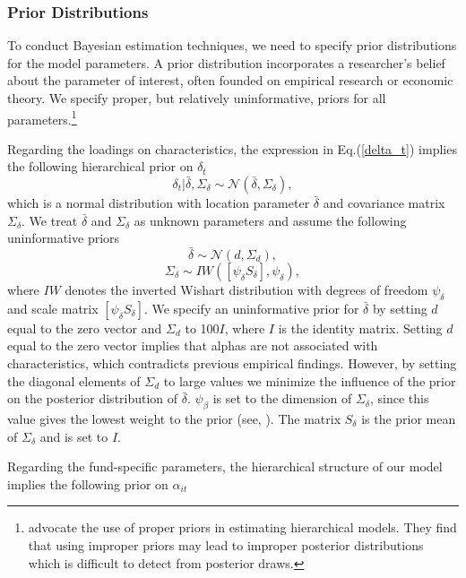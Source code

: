 \subsubsection{ Prior Distributions}
\label{priors}
To conduct Bayesian estimation techniques, we need to specify prior distributions for the model parameters. A prior distribution incorporates a researcher's belief about the parameter of interest, often founded on empirical research or economic theory. We specify proper, but relatively uninformative, priors for all parameters.\footnote{\citet{hobert1996effect} advocate the use of proper priors in estimating hierarchical models. They find that using improper priors may lead to improper posterior distributions which is difficult to detect from posterior draws.}
\par Regarding the loadings on characteristics, the expression in Eq.(\ref{delta_t}) implies the following hierarchical prior on $\delta_t$  
\begin{equation}
    \delta_t|\bar{\delta},\Sigma_\delta \sim \mathcal{N}(\bar{\delta},\Sigma_\delta), 
\end{equation}
which is a normal distribution with location parameter $\bar{\delta}$ and covariance matrix $\Sigma_\delta$. We treat $\bar{\delta}$ and $\Sigma_\delta$ as unknown parameters and assume the following uninformative priors 
\begin{equation}
    \bar{\delta} \sim \mathcal{N}\left(d, \Sigma_{d}\right),
\end{equation}
\begin{equation}
    \Sigma_\delta \sim IW\left([\psi_{\delta}S_\delta],\psi_{\delta}\right),
\end{equation}
where $IW$ denotes the inverted Wishart distribution with degrees of freedom $\psi_{\delta}$ and scale matrix $[\psi_{\delta}S_{\delta}]$.  We specify an uninformative prior for $\bar{\delta}$ by setting $d$ equal to the zero vector and $\Sigma_d$ to 100$I$, where $I$ is the identity matrix. Setting $d$ equal to the zero vector implies that alphas are not associated with characteristics, which contradicts previous empirical findings. However, by setting the diagonal elements of $\Sigma_d$ to large values we minimize the influence of the prior on the posterior distribution of $\bar{\delta}$. $\psi_{\beta}$ is set to the dimension of $\Sigma_{\delta}$, since this value gives the lowest weight to the prior (see, \citet{gelman2014bayesian}). The matrix $S_{\delta}$ is the prior mean of $\Sigma_{\delta}$ and is set to $I$. 
\par Regarding the fund-specific parameters, the hierarchical structure of our model implies the following prior on $\alpha_{it}$
